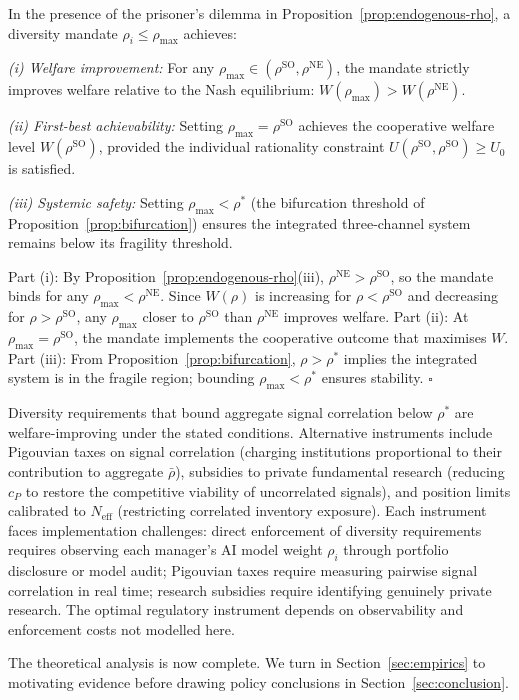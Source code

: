 \begin{proposition}\label{prop:diversity-mandate}
  In the presence of the prisoner's dilemma in Proposition~\ref{prop:endogenous-rho}, a diversity mandate $\rho_i \leq \rho_{\max}$ achieves:

  \emph{(i) Welfare improvement:} For any $\rho_{\max} \in (\rho^{\text{SO}}, \rho^{\text{NE}})$, the mandate strictly improves welfare relative to the Nash equilibrium: $W(\rho_{\max}) > W(\rho^{\text{NE}})$.

  \emph{(ii) First-best achievability:} Setting $\rho_{\max} = \rho^{\text{SO}}$ achieves the cooperative welfare level $W(\rho^{\text{SO}})$, provided the individual rationality constraint $U(\rho^{\text{SO}}, \rho^{\text{SO}}) \geq U_0$ is satisfied.

  \emph{(iii) Systemic safety:} Setting $\rho_{\max} < \rho^*$ (the bifurcation threshold of Proposition~\ref{prop:bifurcation}) ensures the integrated three-channel system remains below its fragility threshold.

   Part (i): By Proposition~\ref{prop:endogenous-rho}(iii), $\rho^{\text{NE}} > \rho^{\text{SO}}$, so the mandate binds for any $\rho_{\max} < \rho^{\text{NE}}$. Since $W(\rho)$ is increasing for $\rho < \rho^{\text{SO}}$ and decreasing for $\rho > \rho^{\text{SO}}$, any $\rho_{\max}$ closer to $\rho^{\text{SO}}$ than $\rho^{\text{NE}}$ improves welfare. Part (ii): At $\rho_{\max} = \rho^{\text{SO}}$, the mandate implements the cooperative outcome that maximises $W$. Part (iii): From Proposition~\ref{prop:bifurcation}, $\rho > \rho^*$ implies the integrated system is in the fragile region; bounding $\rho_{\max} < \rho^*$ ensures stability. $\square$
\end{proposition}

Diversity requirements that bound aggregate signal correlation below $\rho^*$ are welfare-improving under the stated conditions. Alternative instruments include Pigouvian taxes on signal correlation (charging institutions proportional to their contribution to aggregate $\bar{\rho}$), subsidies to private fundamental research (reducing $c_P$ to restore the competitive viability of uncorrelated signals), and position limits calibrated to $N_{\text{eff}}$ (restricting correlated inventory exposure). Each instrument faces implementation challenges: direct enforcement of diversity requirements requires observing each manager's AI model weight $\rho_i$ through portfolio disclosure or model audit; Pigouvian taxes require measuring pairwise signal correlation in real time; research subsidies require identifying genuinely private research. The optimal regulatory instrument depends on observability and enforcement costs not modelled here.

The theoretical analysis is now complete. We turn in Section~\ref{sec:empirics} to motivating evidence before drawing policy conclusions in Section~\ref{sec:conclusion}.
